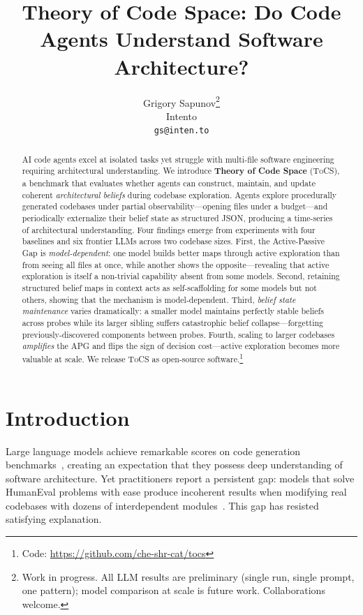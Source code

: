 \documentclass{article}
\title{Theory of Code Space: Do Code Agents Understand Software Architecture?}
\author{
  Grigory Sapunov\thanks{Work in progress. All LLM results are preliminary (single run, single prompt, one pattern); model comparison at scale is future work. Collaborations welcome.} \\
  Intento \\
  \texttt{gs@inten.to}
}
\newcommand{\tocs}{\textsc{ToCS}}
\begin{document}
\maketitle

\begin{abstract}
AI code agents excel at isolated tasks yet struggle with multi-file software engineering requiring architectural understanding. We introduce \textbf{Theory of Code Space} (\tocs{}), a benchmark that evaluates whether agents can construct, maintain, and update coherent \emph{architectural beliefs} during codebase exploration. Agents explore procedurally generated codebases under partial observability---opening files under a budget---and periodically externalize their belief state as structured JSON, producing a time-series of architectural understanding. Four findings emerge from experiments with four baselines and six frontier LLMs across two codebase sizes. First, the Active-Passive Gap is \emph{model-dependent}: one model builds better maps through active exploration than from seeing all files at once, while another shows the opposite---revealing that active exploration is itself a non-trivial capability absent from some models. Second, retaining structured belief maps in context acts as self-scaffolding for some models but not others, showing that the mechanism is model-dependent. Third, \emph{belief state maintenance} varies dramatically: a smaller model maintains perfectly stable beliefs across probes while its larger sibling suffers catastrophic belief collapse---forgetting previously-discovered components between probes. Fourth, scaling to larger codebases \emph{amplifies} the APG and flips the sign of decision cost---active exploration becomes more valuable at scale. We release \tocs{} as open-source software.\footnote{Code: \url{https://github.com/che-shr-cat/tocs}}
\end{abstract}

\section{Introduction}
\label{sec:intro}

Large language models achieve remarkable scores on code generation benchmarks~\citep{chen2021codex, austin2021program}, creating an expectation that they possess deep understanding of software architecture. Yet practitioners report a persistent gap: models that solve HumanEval problems with ease produce incoherent results when modifying real codebases with dozens of interdependent modules~\citep{jimenez2024swebench}. This gap has resisted satisfying explanation.
\end{document}

